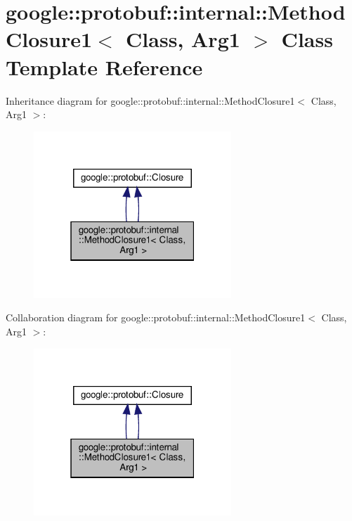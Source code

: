 \hypertarget{classgoogle_1_1protobuf_1_1internal_1_1MethodClosure1}{}\section{google\+:\+:protobuf\+:\+:internal\+:\+:Method\+Closure1$<$ Class, Arg1 $>$ Class Template Reference}
\label{classgoogle_1_1protobuf_1_1internal_1_1MethodClosure1}


Inheritance diagram for google\+:\+:protobuf\+:\+:internal\+:\+:Method\+Closure1$<$ Class, Arg1 $>$\+:
\nopagebreak
\begin{figure}[H]
\begin{center}
\leavevmode
\includegraphics[width=211pt]{classgoogle_1_1protobuf_1_1internal_1_1MethodClosure1__inherit__graph}
\end{center}
\end{figure}


Collaboration diagram for google\+:\+:protobuf\+:\+:internal\+:\+:Method\+Closure1$<$ Class, Arg1 $>$\+:
\nopagebreak
\begin{figure}[H]
\begin{center}
\leavevmode
\includegraphics[width=211pt]{classgoogle_1_1protobuf_1_1internal_1_1MethodClosure1__coll__graph}
\end{center}
\end{figure}

